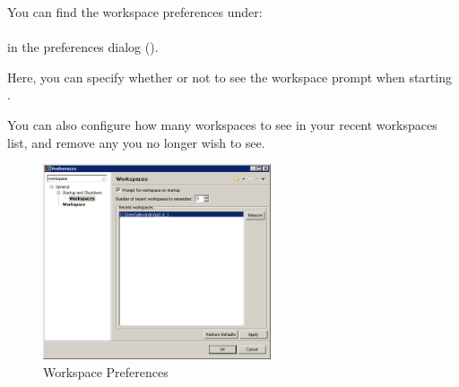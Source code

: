 You can find the workspace preferences under:\\
\\
in the preferences dialog ().

Here, you can specify whether or not to see the workspace prompt when starting \app{}. 

You can also configure how many workspaces to see in your recent workspaces list, and remove any you no longer wish to see. 


\begin{figure}[h]
\begin{center}
\includegraphics[width=0.60\textwidth]{Tasks/Preferences/PS/workspaceprefs}
\caption{Workspace Preferences}
\label{WorkspacePrefs}
\end{center}
\end{figure}
